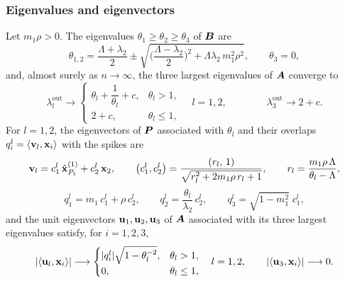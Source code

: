 \subsubsection{Eigenvalues and eigenvectors}
\begin{prop}\label{prop:spectrum_A}
Let $m_1\rho > 0$. The eigenvalues $\theta_1\ge\theta_2\ge\theta_3$ of $\bm{B}$ are
\begin{equation}
    \theta_{1,2} = \frac{\Lambda+\lambda_2}{2} \pm \sqrt{\Big(\frac{\Lambda-\lambda_2}{2}\Big)^2 + \Lambda\lambda_2\,m_1^2\rho^2},
    \qquad \theta_3 = 0 ,
    \label{eq:theta_A}
\end{equation}
and, almost surely as $n\to\infty$, the three largest eigenvalues of $\bm{A}$ converge to
\begin{equation}
    \lambda^{\mathrm{out}}_l \longrightarrow
    \begin{cases}
        \theta_l + \dfrac{1}{\theta_l} + c, & \theta_l > 1,\\[6pt]
        2 + c, & \theta_l \le 1,
    \end{cases}
    \quad l = 1,2,
    \qquad\qquad
    \lambda^{\mathrm{out}}_3 \longrightarrow 2 + c .
    \label{eq:outliers_A}
\end{equation}
For $l=1,2$, the eigenvectors of $\bm{P}$ associated with $\theta_l$ and their overlaps $q_i^l = \langle\boldsymbol{\mathbf{v}}_l,\boldsymbol{\mathbf{x}}_i\rangle$ with the spikes are
\begin{equation}
    \boldsymbol{\mathbf{v}}_l = c_1^l\,\hat{\boldsymbol{\mathbf{x}}}^{(1)}_{P_1} + c_2^l\,\boldsymbol{\mathbf{x}}_2, \qquad
    \big(c_1^l, c_2^l\big) = \frac{(r_l,\,1)}{\sqrt{r_l^2 + 2m_1\rho\,r_l + 1}}, \qquad
    r_l = \frac{m_1\rho\,\Lambda}{\theta_l - \Lambda} ,
    \label{eq:v_A} 
\end{equation}
\begin{equation}
    q_1^l = m_1\,c_1^l + \rho\,c_2^l, \qquad
    q_2^l = \frac{\theta_l}{\lambda_2}\,c_2^l, \qquad
    q_3^l = \sqrt{1-m_1^2}\;c_1^l ,
    \label{eq:q_A}
\end{equation}
and the unit eigenvectors $\boldsymbol{\mathbf{u}}_1,\boldsymbol{\mathbf{u}}_2,\boldsymbol{\mathbf{u}}_3$ of $\bm{A}$ associated with its three largest eigenvalues satisfy, for $i=1,2,3$,
\begin{equation}
    |\langle\boldsymbol{\mathbf{u}}_l,\boldsymbol{\mathbf{x}}_i\rangle| \longrightarrow
    \begin{cases}
        |q_i^l|\sqrt{1-\theta_l^{-2}}, & \theta_l > 1,\\
        0, & \theta_l \le 1,
    \end{cases}
    \quad l=1,2,
    \qquad
    |\langle\boldsymbol{\mathbf{u}}_3,\boldsymbol{\mathbf{x}}_i\rangle| \longrightarrow 0 .
    \label{eq:overlaps_A}
\end{equation}
\end{prop}
